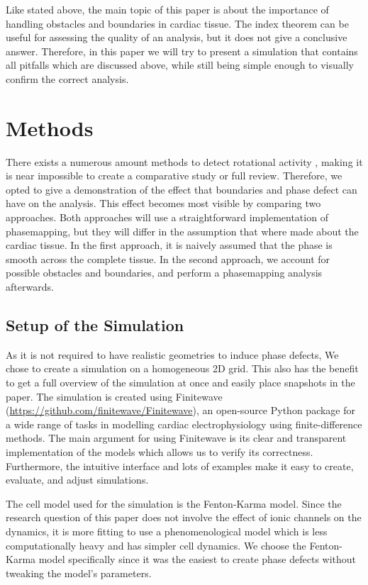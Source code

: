 \documentclass[twocolumn]{article}
\begin{document}
\noindent Like stated above, the main topic of this paper is about the importance
of handling obstacles and boundaries in cardiac tissue.
The index theorem can be useful for assessing the quality of an analysis,
but it does not give a conclusive answer.
Therefore, in this paper we will try to present a simulation
that contains all pitfalls which are discussed above,
while still being simple enough to visually confirm the correct analysis.

\section{Methods}\label{methods}

There exists a numerous amount methods to detect rotational activity \autocite{pikunov2023the, gurevich2019robust, li2020standardizing},
making it is near impossible to create a comparative study or full review.
Therefore, we opted to give a demonstration of the effect
that boundaries and phase defect can have on the analysis.
This effect becomes most visible by comparing two approaches.
Both approaches will use a straightforward implementation of phasemapping, but
they will differ in the assumption that where made about the cardiac tissue.
In the first approach, it is naively assumed
that the phase is smooth across the complete tissue.
In the second approach, we account for possible obstacles and boundaries,
and perform a phasemapping analysis afterwards.

\subsection{Setup of the Simulation}\label{setup-of-the-simulation}

As it is not required to have realistic geometries to induce phase
defects, We chose to create a simulation on a homogeneous 2D grid. This
also has the benefit to get a full overview of the simulation at once
and easily place snapshots in the paper.
The simulation is created using Finitewave
(\url{https://github.com/finitewave/Finitewave}), an open-source Python
package for a wide range of tasks in modelling cardiac electrophysiology
using finite-difference methods. The main argument for using Finitewave
is its clear and transparent implementation of the models which allows
us to verify its correctness. Furthermore, the intuitive interface and
lots of examples make it easy to create, evaluate, and adjust
simulations.

The cell model used for the simulation is the Fenton-Karma model. Since
the research question of this paper does not involve the effect of ionic
channels on the dynamics, it is more fitting to use a phenomenological
model which is less computationally heavy and has simpler cell dynamics.
We choose the Fenton-Karma model specifically since it was the easiest
to create phase defects without tweaking the model's parameters.
\end{document}
